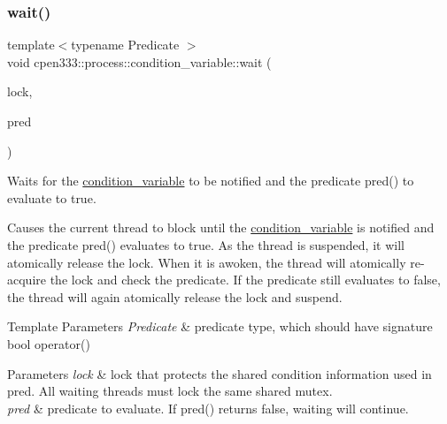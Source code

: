 \subsubsection{\texorpdfstring{wait()}{wait()}\hspace{0.1cm}{\footnotesize\ttfamily [2/2]}}
{\footnotesize\ttfamily template$<$typename Predicate $>$ \\
void cpen333\+::process\+::condition\+\_\+variable\+::wait (\begin{DoxyParamCaption}\item[{std\+::unique\+\_\+lock$<$ \hyperlink{classcpen333_1_1process_1_1mutex}{cpen333\+::process\+::mutex} $>$ \&}]{lock,  }\item[{Predicate}]{pred }\end{DoxyParamCaption})\hspace{0.3cm}{\ttfamily [inline]}}



Waits for the \hyperlink{classcpen333_1_1process_1_1condition__variable}{condition\+\_\+variable} to be notified and the predicate {\ttfamily pred()} to evaluate to {\ttfamily true}. 

Causes the current thread to block until the \hyperlink{classcpen333_1_1process_1_1condition__variable}{condition\+\_\+variable} is notified and the predicate {\ttfamily pred()} evaluates to true. As the thread is suspended, it will atomically release the lock. When it is awoken, the thread will atomically re-\/acquire the lock and check the predicate. If the predicate still evaluates to {\ttfamily false}, the thread will again atomically release the lock and suspend.


\begin{DoxyTemplParams}{Template Parameters}
{\em Predicate} & predicate type, which should have signature {\ttfamily bool operator()} \\
\hline
\end{DoxyTemplParams}

\begin{DoxyParams}{Parameters}
{\em lock} & lock that protects the shared condition information used in {\ttfamily pred}. All waiting threads must lock the same shared mutex. \\
\hline
{\em pred} & predicate to evaluate. If {\ttfamily pred()} returns {\ttfamily false}, waiting will continue. \\
\hline
\end{DoxyParams}
\mbox{\label{classcpen333_1_1process_1_1condition__variable_a6c6f153853d2c8d455781f0c35fdcb3b}} 
